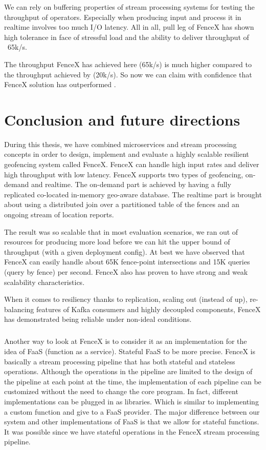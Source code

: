 \documentclass[a4]{report}
\begin{document}
    We can rely on buffering properties of stream processing systems for testing the throughput of operators.
    Especially when producing input and process it in realtime involves too much I/O latency.
    All in all, pull leg of FenceX has shown high tolerance in face of stressful load and the ability to deliver throughput of ~65k/s.

    The throughput FenceX has achieved here (65k/s) is much higher compared to the throughput achieved by
    \cite{Nechifor_Comnac_2013} (20k/s).
    So now we can claim with confidence that FenceX solution has outperformed \cite{Nechifor_Comnac_2013}.

    \clearpage


    \chapter{Conclusion and future directions}
    During this thesis, we have combined microservices and stream processing concepts in order to design, implement
    and evaluate a highly scalable resilient geofencing system called FenceX.
    FenceX can handle high input rates and deliver high throughput with low latency.
    FenceX supports two types of geofencing, on-demand and realtime.
    The on-demand part is achieved by having a fully replicated co-located in-memory geo-aware database.
    The realtime part is brought about using a distributed join over a partitioned table of the fences and an ongoing stream of location reports.

    The result was so scalable that in most evaluation scenarios, we ran out of resources for producing more load
    before we can hit the upper bound of throughput (with a given deployment config).
    At best we have observed that FenceX can easily handle about 65K fence-point intersections and 15K queries (query by
    fence) per second.
    FenceX also has proven to have strong and weak scalability characteristics.

    When it comes to resiliency thanks to replication, scaling out (instead of up), re-balancing features of Kafka
    consumers and highly decoupled components, FenceX has demonstrated being reliable under non-ideal conditions.

    \paragraph{}
    Another way to look at FenceX is to consider it as an implementation for the idea of FaaS (function as a service).
    Stateful FaaS to be more precise.
    FenceX is basically a stream processing pipeline that has both stateful and stateless operations.
    Although the operations in the pipeline are limited to the design of the pipeline at each point at the time, the implementation of each pipeline can be customized without the need to change the core program.
    In fact, different implementations can be plugged in as libraries.
    Which is similar to implementing a custom function and give to a FaaS provider.
    The major difference between our system and other implementations of FaaS is that we allow for stateful functions.
    It was possible since we have stateful operations in the FenceX stream processing pipeline.
\end{document}
